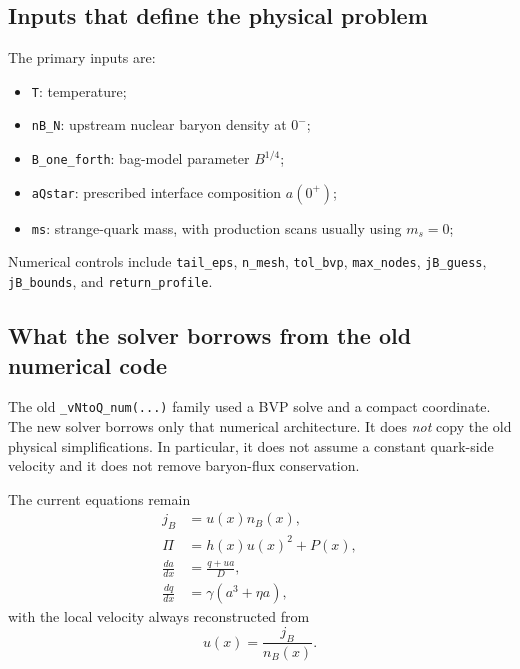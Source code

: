 \documentclass[11pt]{article}
\begin{document}
\subsection{Inputs that define the physical problem}
The primary inputs are:
\begin{itemize}[leftmargin=1.5em]
\item \texttt{T}: temperature;
\item \texttt{nB\_N}: upstream nuclear baryon density at $0^-$;
\item \texttt{B\_one\_forth}: bag-model parameter $B^{1/4}$;
\item \texttt{aQstar}: prescribed interface composition $a(0^+)$;
\item \texttt{ms}: strange-quark mass, with production scans usually using
      $m_s=0$;
\end{itemize}
Numerical controls include \texttt{tail\_eps}, \texttt{n\_mesh},
\texttt{tol\_bvp}, \texttt{max\_nodes}, \texttt{jB\_guess},
\texttt{jB\_bounds}, and \texttt{return\_profile}.

\subsection{What the solver borrows from the old numerical code}
The old \texttt{\_vNtoQ\_num(...)} family used a BVP solve and a compact
coordinate. The new solver borrows only that numerical architecture. It does
\emph{not} copy the old physical simplifications. In particular, it does not
assume a constant quark-side velocity and it does not remove baryon-flux
conservation.

The current equations remain
\begin{align}
j_B &= u(x)n_B(x),\\
\Pi &= h(x)u(x)^2 + P(x),\\
\frac{da}{dx} &= \frac{q+u a}{D},\\
\frac{dq}{dx} &= \gamma(a^3+\eta a),
\end{align}
with the local velocity always reconstructed from
\begin{equation}
u(x)=\frac{j_B}{n_B(x)}.
\end{equation}
\end{document}

